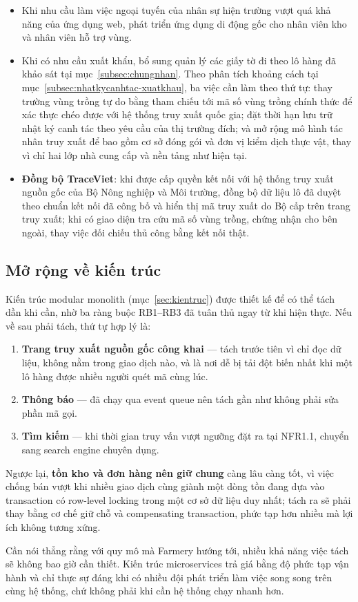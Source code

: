 \begin{itemize}
    \item Khi nhu cầu làm việc ngoại tuyến của nhân sự hiện trường vượt quá khả năng của ứng dụng web, phát triển ứng dụng di động gốc cho nhân viên kho và nhân viên hỗ trợ vùng.
    \item Khi có nhu cầu xuất khẩu, bổ sung quản lý các giấy tờ đi theo lô hàng đã khảo sát tại mục~\ref{subsec:chungnhan}. Theo phân tích khoảng cách tại mục~\ref{subsec:nhatkycanhtac-xuatkhau}, ba việc cần làm theo thứ tự: thay trường vùng trồng tự do bằng tham chiếu tới mã số vùng trồng chính thức để xác thực chéo được với hệ thống truy xuất quốc gia; đặt thời hạn lưu trữ nhật ký canh tác theo yêu cầu của thị trường đích; và mở rộng mô hình tác nhân truy xuất để bao gồm cơ sở đóng gói và đơn vị kiểm dịch thực vật, thay vì chỉ hai lớp nhà cung cấp và nền tảng như hiện tại.
    \item \textbf{Đồng bộ TraceViet}: khi được cấp quyền kết nối với hệ thống truy xuất nguồn gốc của Bộ Nông nghiệp và Môi trường, đồng bộ dữ liệu lô đã duyệt theo chuẩn kết nối đã công bố và hiển thị mã truy xuất do Bộ cấp trên trang truy xuất; khi có giao diện tra cứu mã số vùng trồng, chứng nhận cho bên ngoài, thay việc đối chiếu thủ công bằng kết nối thật.
\end{itemize}

\subsection{Mở rộng về kiến trúc}

Kiến trúc modular monolith (mục~\ref{sec:kientruc}) được thiết kế để có thể tách dần khi cần, nhờ ba ràng buộc RB1--RB3 đã tuân thủ ngay từ khi hiện thực. Nếu về sau phải tách, thứ tự hợp lý là:

\begin{enumerate}
    \item \textbf{Trang truy xuất nguồn gốc công khai} --- tách trước tiên vì chỉ đọc dữ liệu, không nằm trong giao dịch nào, và là nơi dễ bị tải đột biến nhất khi một lô hàng được nhiều người quét mã cùng lúc.
    \item \textbf{Thông báo} --- đã chạy qua event queue nên tách gần như không phải sửa phần mã gọi.
    \item \textbf{Tìm kiếm} --- khi thời gian truy vấn vượt ngưỡng đặt ra tại NFR1.1, chuyển sang search engine chuyên dụng.
\end{enumerate}

Ngược lại, \textbf{tồn kho và đơn hàng nên giữ chung} càng lâu càng tốt, vì việc chống bán vượt khi nhiều giao dịch cùng giành một dòng tồn đang dựa vào transaction có row-level locking trong một cơ sở dữ liệu duy nhất; tách ra sẽ phải thay bằng cơ chế giữ chỗ và compensating transaction, phức tạp hơn nhiều mà lợi ích không tương xứng.

Cần nói thẳng rằng với quy mô mà Farmery hướng tới, nhiều khả năng việc tách sẽ không bao giờ cần thiết. Kiến trúc microservices trả giá bằng độ phức tạp vận hành và chỉ thực sự đáng khi có nhiều đội phát triển làm việc song song trên cùng hệ thống, chứ không phải khi cần hệ thống chạy nhanh hơn.
